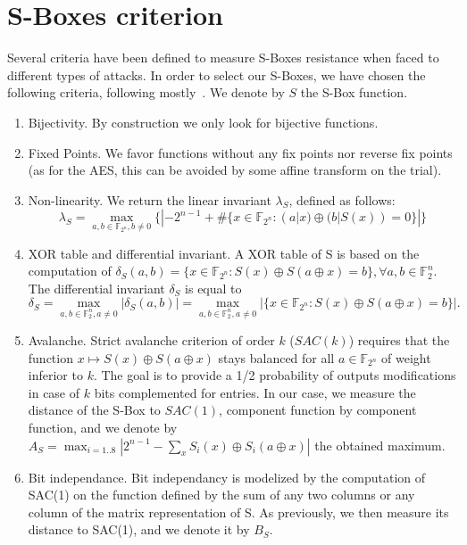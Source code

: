\documentclass{article}\usepackage{amsthm}
\newcommand{\SBox}{S-Box\xspace}
\newcommand{\SBoxes}{S-Boxes\xspace}
\begin{document}
\section{\SBoxes criterion}\label{sec:crit}

Several criteria have been defined to measure \SBoxes resistance when faced to different types of attacks. In order to select our \SBoxes, we have chosen the following criteria, following mostly~\cite{Alvarez:2008:apn}. 
We denote by $S$ the \SBox function.
\begin{enumerate}
\item Bijectivity. By construction we only look for bijective functions.
\item Fixed Points. We favor functions without any fix points nor reverse fix points (as for the AES, this can be avoided by some affine transform on the trial). 
\item Non-linearity. We return the linear invariant $\lambda_S$, defined as follows:  
						$$\lambda_S = \displaystyle \max_{a,b\in \mathbb{F}_{2^n}, b\ne 0} \{ |-2^{n-1} + \#\{x \in \mathbb{F}_{2^n} : (a|x) \oplus (b|S(x)) = 0 \} | \} $$
\item XOR table and differential invariant.  A XOR table of S is based on the
  computation of $\delta_S(a,b) = \{x \in \mathbb{F}_{2^n} : S(x) \oplus S(a
  \oplus x) = b \}, \forall a,b\in \mathbb{F}_2^n$. The differential invariant
  $\delta_S$ is equal to  
$$ \delta_S=\max_{a,b\in \mathbb{F}_2^n, a\ne 0} |\delta_S(a,b)| 
=\max_{a,b\in \mathbb{F}_2^n, a\ne 0} | \{x \in \mathbb{F}_{2^n} : S(x) \oplus S(a
  \oplus x) = b \}|
.$$ 






\item Avalanche. Strict avalanche criterion of order $k$ ($SAC(k)$) requires
  that the function $x \mapsto S(x) \oplus S(a \oplus x)$ stays balanced for all
  $a \in \mathbb{F}_{2^n}$ of weight inferior to $k$. The goal is to provide a
  1/2 probability of outputs modifications in case of $k$ bits complemented for
  entries.  
 In our case, we measure the distance of the \SBox to $SAC(1)$, component
 function by component function, and we denote by $A_S = \displaystyle \max_{i=1..8} |
 2^{n-1}-\sum_x S_i(x) \oplus S_i(a \oplus x)|$ the obtained maximum.


\item Bit independance. Bit independancy is modelized by the computation of
  SAC(1) on the function defined by the sum of any two columns or any column of
  the matrix representation of S. As previously, we then measure its distance to
  SAC(1), and we denote it by $B_S$.  



\end{enumerate}
\end{document}
